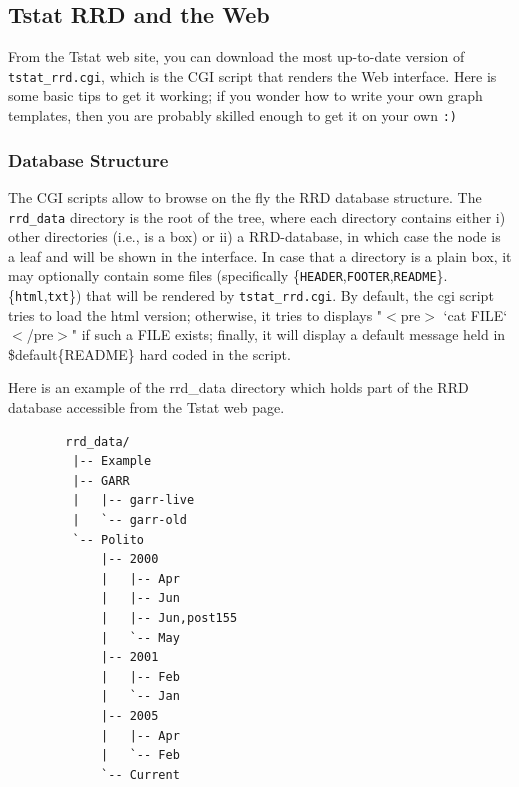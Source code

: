 \documentclass[11pt]{article}
\begin{document}
\subsection{Tstat RRD and the Web\label{Tstat_RRD_and_the_Web}}


From the Tstat web site, you can
download the most up-to-date version of \texttt{tstat\_rrd.cgi},
which is the CGI script that renders the Web interface.
Here is some basic tips to get it working; if you wonder
how to write your own graph templates, then you are probably
skilled enough to get it on your own \texttt{:)}

\subsubsection{Database Structure\label{Database_Structure}}


The CGI scripts allow to browse on the fly the RRD database structure.
The \texttt{rrd\_data} directory is the root of the tree, where each
directory contains either i) other directories (i.e., is a box) 
or ii) a RRD-database, in which case the node is a leaf and will be
shown in the interface. In case that a directory is a plain box, it may
optionally contain some files (specifically 
\{\texttt{HEADER},\texttt{FOOTER},\texttt{README}\}.\{\texttt{html},\texttt{txt}\})
that will be rendered by \texttt{tstat\_rrd.cgi}. 
By default, the cgi script tries to load the html version;
otherwise, it tries to displays "$<$pre$>$ `cat FILE` $<$/pre$>$"
if such a FILE exists; finally, it will display a default message
held in \$default\{README\} hard coded in the script.



Here is an example of the rrd\_data directory which holds part of the RRD database
accessible from the Tstat web page.

\begin{small}\begin{verbatim}
        rrd_data/
         |-- Example
         |-- GARR
         |   |-- garr-live
         |   `-- garr-old
         `-- Polito
             |-- 2000
             |   |-- Apr
             |   |-- Jun
             |   |-- Jun,post155
             |   `-- May
             |-- 2001
             |   |-- Feb
             |   `-- Jan
             |-- 2005
             |   |-- Apr
             |   `-- Feb
             `-- Current
\end{verbatim}\end{small} \noindent
\end{document}
